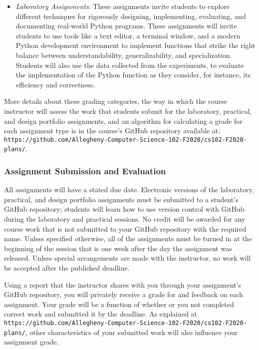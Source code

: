 \documentclass[11pt]{article}
\newcommand{\url}[1]{\lstinline{#1}}
\begin{document}
\begin{itemize}
  \item {\em Laboratory Assignments\/}: These assignments invite students to
    explore different techniques for rigorously designing, implementing,
    evaluating, and documenting real-world Python programs. These assignments
    will invite students to use tools like a text editor, a terminal window,
    and a modern Python development environment to implement functions that
    strike the right balance between understandability, generalizability, and
    specialization. Students will also use the data collected from the
    experiments, to evaluate the implementation of the Python function as they
    consider, for instance, its efficiency and correctness.

\end{itemize}

\noindent More details about these grading categories, the way in which the
course instructor will assess the work that students submit for the laboratory,
practical, and design portfolio assignments, and an algorithm for calculating a
grade for each assignment type is in the course's GitHub repository available
at:
\url{https://github.com/Allegheny-Computer-Science-102-F2020/cs102-F2020-plans/}.

\subsubsection*{Assignment Submission and Evaluation}

All assignments will have a stated due date. Electronic versions of the
laboratory, practical, and design portfolio assignments must be submitted to a
student's GitHub repository; students will learn how to use version control with
GitHub during the laboratory and practical sessions. No credit will be awarded
for any course work that is not submitted to your GitHub repository with the
required name. Unless specified otherwise, all of the assignments must be turned
in at the beginning of the session that is one week after the day the assignment
was released. Unless special arrangements are made with the instructor, no work
will be accepted after the published deadline.

Using a report that the instructor shares with you through your assignment's
GitHub repository, you will privately receive a grade for and feedback on each
assignment. Your grade will be a function of whether or you not completed
correct work and submitted it by the deadline. As explained at
\url{https://github.com/Allegheny-Computer-Science-102-F2020/cs102-F2020-plans/},
other characteristics of your submitted work will also influence your assignment
grade.
\end{document}
